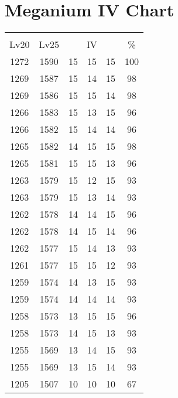 \documentclass{article}%
\begin{document}
%
\normalsize%
\section{Meganium IV Chart}%
\label{sec:Meganium IV Chart}%
\renewcommand{\arraystretch}{1.5}%
\begin{tabular}{|c|c|c|c|c|c|}%
\hline%
\multicolumn{6}{|c|}{\textcolor{white}{ 
\linebreak{Meganium}
}%
\cellcolor{black}}\\%
\multicolumn{1}{|c}{Lv20}&\multicolumn{1}{c|}{Lv25}&\multicolumn{3}{c|}{IV}&\multicolumn{1}{|c|}{\%}\\%
\hline%
\rowcolor{color100}%
1272&1590&15&15&15&100\\%
\hline%
\rowcolor{color98}%
1269&1587&15&14&15&98\\%
\hline%
\rowcolor{color98}%
1269&1586&15&15&14&98\\%
\hline%
\rowcolor{color96}%
1266&1583&15&13&15&96\\%
\hline%
\rowcolor{color96}%
1266&1582&15&14&14&96\\%
\hline%
\rowcolor{color98}%
1265&1582&14&15&15&98\\%
\hline%
\rowcolor{color96}%
1265&1581&15&15&13&96\\%
\hline%
\rowcolor{color93}%
1263&1579&15&12&15&93\\%
\hline%
\rowcolor{color93}%
1263&1579&15&13&14&93\\%
\hline%
\rowcolor{color96}%
1262&1578&14&14&15&96\\%
\hline%
\rowcolor{color96}%
1262&1578&14&15&14&96\\%
\hline%
\rowcolor{color93}%
1262&1577&15&14&13&93\\%
\hline%
\rowcolor{color93}%
1261&1577&15&15&12&93\\%
\hline%
\rowcolor{color93}%
1259&1574&14&13&15&93\\%
\hline%
\rowcolor{color93}%
1259&1574&14&14&14&93\\%
\hline%
\rowcolor{color96}%
1258&1573&13&15&15&96\\%
\hline%
\rowcolor{color93}%
1258&1573&14&15&13&93\\%
\hline%
\rowcolor{color93}%
1255&1569&13&14&15&93\\%
\hline%
\rowcolor{color93}%
1255&1569&13&15&14&93\\%
\hline%
\rowcolor{color91}%
1205&1507&10&10&10&67\\%
\end{tabular}

%
\end{document}
